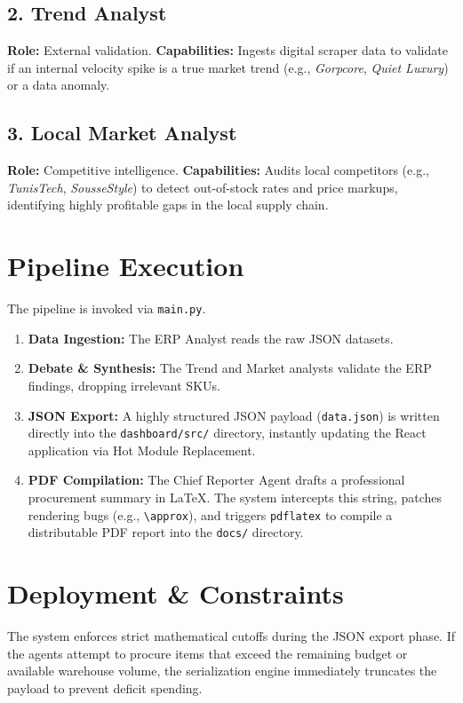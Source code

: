 \documentclass{article}
\begin{document}
\subsection{2. Trend Analyst}
\textbf{Role:} External validation.
\textbf{Capabilities:} Ingests digital scraper data to validate if an internal velocity spike is a true market trend (e.g., \textit{Gorpcore}, \textit{Quiet Luxury}) or a data anomaly. 

\subsection{3. Local Market Analyst}
\textbf{Role:} Competitive intelligence.
\textbf{Capabilities:} Audits local competitors (e.g., \textit{TunisTech}, \textit{SousseStyle}) to detect out-of-stock rates and price markups, identifying highly profitable gaps in the local supply chain.

\section{Pipeline Execution}
The pipeline is invoked via \texttt{main.py}. 
\begin{enumerate}
    \item \textbf{Data Ingestion:} The ERP Analyst reads the raw JSON datasets.
    \item \textbf{Debate \& Synthesis:} The Trend and Market analysts validate the ERP findings, dropping irrelevant SKUs.
    \item \textbf{JSON Export:} A highly structured JSON payload (\texttt{data.json}) is written directly into the \texttt{dashboard/src/} directory, instantly updating the React application via Hot Module Replacement.
    \item \textbf{PDF Compilation:} The Chief Reporter Agent drafts a professional procurement summary in LaTeX. The system intercepts this string, patches rendering bugs (e.g., \texttt{\textbackslash approx}), and triggers \texttt{pdflatex} to compile a distributable PDF report into the \texttt{docs/} directory.
\end{enumerate}

\section{Deployment \& Constraints}
\begin{tcolorbox}[colback=black!5!white,colframe=black!75!black,title=Safety Parameters]
The system enforces strict mathematical cutoffs during the JSON export phase. If the agents attempt to procure items that exceed the remaining budget or available warehouse volume, the serialization engine immediately truncates the payload to prevent deficit spending.
\end{tcolorbox}
\end{document}
